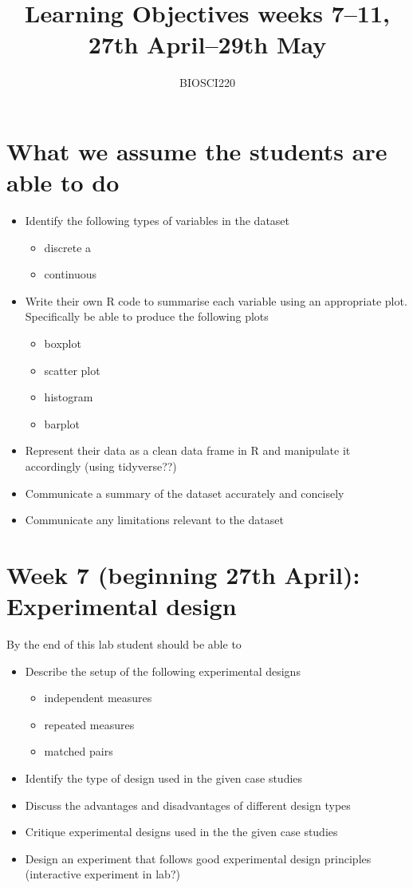 \documentclass{article}
\begin{document}
\title{Learning Objectives weeks 7--11, 27th April--29th May}
\author{BIOSCI220}
\date{}
\maketitle


\section*{What we assume the students are able to do}
\begin{itemize}
\item Identify the following types of variables in the dataset
  \begin{itemize}
  \item discrete
a  \item continuous
  \end{itemize}
\item Write their own R code to summarise each variable using an appropriate plot. Specifically be able to produce the following plots
  \begin{itemize}
  \item boxplot
  \item scatter plot
  \item histogram
  \item barplot
  \end{itemize}
\item Represent their data as a clean data frame in R and manipulate it accordingly (using tidyverse??)
\item Communicate a summary of the dataset accurately and concisely
\item Communicate any limitations relevant to the dataset
\end{itemize}


\section*{Week 7 (beginning 27th April):  Experimental design}
By the end of this lab student should be able to
\begin{itemize}
\item Describe the setup of the following experimental designs
  \begin{itemize}
  \item independent measures
  \item repeated measures
    \item matched pairs
  \end{itemize}
\item Identify the type of design used in the given case studies
  \item Discuss the advantages and disadvantages of different design types
\item Critique experimental designs used in the the given case studies
\item Design an experiment that follows good experimental design principles (interactive experiment in lab?)
\end{itemize}
\end{document}
